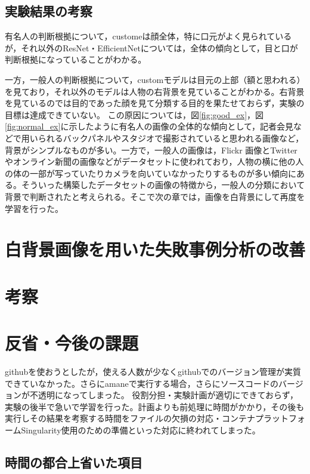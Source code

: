 \documentclass[a4paper,11pt,titlepage]{jsarticle}
\begin{document}
\subsection{実験結果の考察}
有名人の判断根拠について，customeは顔全体，特に口元がよく見られているが，それ以外のResNet・EfficientNetについては，全体の傾向として，目と口が判断根拠になっていることがわかる。\par
一方，一般人の判断根拠について，customモデルは目元の上部（額と思われる）を見ており，それ以外のモデルは人物の右背景を見ていることがわかる。右背景を見ているのでは目的であった顔を見て分類する目的を果たせておらず，実験の目標は達成できていない。
この原因については，図\ref{fig:good_ex}，図\ref{fig:normal_ex}に示したように有名人の画像の全体的な傾向として，記者会見などで用いられるバックパネルやスタジオで撮影されていると思われる画像など，背景がシンプルなものが多い。一方で，一般人の画像は，Flickr 画像とTwitterやオンライン新聞の画像などがデータセットに使われており，人物の横に他の人の体の一部が写っていたりカメラを向いていなかったりするものが多い傾向にある。そういった構築したデータセットの画像の特徴から，一般人の分類において背景で判断されたと考えられる。そこで次の章では，画像を白背景にして再度を学習を行った。



\section{白背景画像を用いた失敗事例分析の改善}




\section{考察}

\section{反省・今後の課題}
githubを使おうとしたが，使える人数が少なくgithubでのバージョン管理が実質できていなかった。さらにamaneで実行する場合，さらにソースコードのバージョンが不透明になってしまった。
役割分担・実験計画が適切にできておらず，実験の後半で急いで学習を行った。計画よりも前処理に時間がかかり，その後も実行しその結果を考察する時間をファイルの欠損の対応・コンテナプラットフォームSingularity使用のための準備といった対応に終われてしまった。

\subsection{時間の都合上省いた項目}
\end{document}
